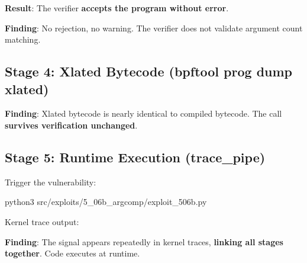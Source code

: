 \noindent
\textbf{Result}: The verifier \textbf{accepts the program without error}.

\noindent
\textbf{Finding}: No rejection, no warning. The verifier does not validate argument count matching.

\subsection{Stage 4: Xlated Bytecode (bpftool prog dump xlated)}

\vspace{0.3cm}
\noindent
{}
\vspace{0.3cm}

\noindent
\textbf{Finding}: Xlated bytecode is nearly identical to compiled bytecode. The call \textbf{survives verification unchanged}.

\subsection{Stage 5: Runtime Execution (trace\_pipe)}

Trigger the vulnerability:

\begin{tcolorbox}[colback=gray!10, colframe=gray!10, arc=2pt, boxrule=0pt]
\small\ttfamily
python3 src/exploits/5\_06b\_argcomp/exploit\_506b.py
\end{tcolorbox}

\noindent
Kernel trace output:

\vspace{0.3cm}
\noindent
{}
\vspace{0.3cm}

\noindent
\textbf{Finding}: The signal appears repeatedly in kernel traces, \textbf{linking all stages together}. Code executes at runtime.

